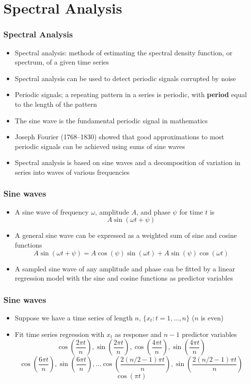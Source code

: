 \documentclass{beamer}
\begin{document}
\section{Spectral Analysis}

\begin{frame}
    \frametitle{Spectral Analysis}
    \begin{itemize}
        \item \alert{Spectral analysis}: methods of estimating the spectral density function, or \alert{spectrum}, of a given time series
        \item Spectral analysis can be used to detect periodic signals corrupted by noise
        \item Periodic signals; a repeating pattern in a series is \alert{periodic}, with \textbf{period} equal to the length of the pattern
        \item The \alert{sine} wave is the fundamental periodic signal in mathematics
        \item Joseph Fourier (1768--1830) showed that good approximations to most periodic signals can be achieved using sums of sine waves
        \item Spectral analysis is based on sine waves and a decomposition of variation in series into waves of various frequencies
    \end{itemize}
\end{frame}

\begin{frame}
    \frametitle{Sine waves}
    \begin{itemize}
        \item A sine wave of \alert{frequency} $\omega$, \alert{amplitude} $A$, and \alert{phase} $\psi$ for time $t$ is
        $$A\sin(\omega t + \psi)$$
        \item A general sine wave can be expressed as a weighted sum of sine and cosine functions
        $$A\sin(\omega t + \psi) = A\cos(\psi)\sin(\omega t) + A\sin(\psi)\cos(\omega t)$$
        \item A sampled sine wave of any amplitude and phase can be fitted by a linear regression model with the sine and cosine functions as predictor variables
    \end{itemize}
\end{frame}

\begin{frame}
    \frametitle{Sine waves}
    \begin{itemize}
        \item Suppose we have a time series of length $n$, $\{x_t : t = 1, \ldots, n\}$ ($n$ is even)
        \item Fit time series regression with $x_t$ as response and $n - 1$ predictor variables
        $$\cos\left(\frac{2 \pi t}{n}\right), \sin\left(\frac{2 \pi t}{n}\right), \cos\left(\frac{4 \pi t}{n}\right), \sin\left(\frac{4 \pi t}{n}\right)$$
        $$\cos\left(\frac{6 \pi t}{n}\right), \sin\left(\frac{6 \pi t}{n}\right), \ldots \cos\left(\frac{2(n/2-1) \pi t}{n}\right), \sin\left(\frac{2(n/2-1) \pi t}{n}\right)$$
        $$\cos(\pi t)$$
    \end{itemize}
\end{frame}
\end{document}
